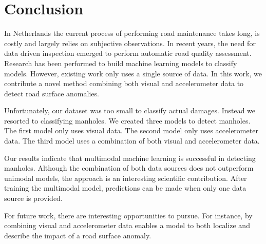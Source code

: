 \clearpage
\section{Conclusion}
\label{sec:conclusion}

In Netherlands the current process of performing road maintenance takes long, is costly and largely relies on subjective observations. In recent years, the need for data driven inspection emerged to perform automatic road quality assessment. Research has been performed to build machine learning models to classify models. However, existing work only uses a single source of data. In this work, we contribute a novel method combining both visual and accelerometer data to detect road surface anomalies.

Unfortunately, our dataset was too small to classify actual damages. Instead we resorted to classifying manholes. We created three models to detect manholes. The first model only uses visual data. The second model only uses accelerometer data. The third model uses a combination of both visual and accelerometer data. 

Our results indicate that multimodal machine learning is successful in detecting manholes. Although the combination of both data sources does not outperform unimodal models, the approach is an interesting scientific contribution. After training the multimodal model, predictions can be made when only one data source is provided. 

For future work, there are interesting opportunities to pursue. For instance, by combining visual and accelerometer data enables a model to both localize and describe the impact of a road surface anomaly.